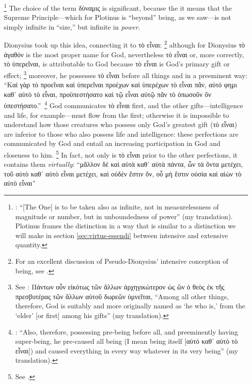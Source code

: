 %
\footnote{\cite[VI,~9,~6]{plotinus:enneads}: “[The One] is to be taken also as infinite, not in measurelessness of magnitude or number, but in unboundedness of power” (my translation). Plotinus frames the distinction in a way that is similar to a distinction we will make in section \ref{sec:virtus-essendi} between intensive and extensive quantity.} The choice of the term δύναμις is significant, because the it means that the Supreme Principle—which for Plotinus is “beyond” being, as we saw—is not simply infinite in “size,” but infinite in \emph{power}.

Dionysius took up this idea, connecting it to τὸ εἶναι:%
%
\footnote{For an excellent  discussion of Pseudo-Dionysius’ intensive conception of being, see \cite[50–56]{orourke:pseudo-dionysius}.} although for Dionysius τὸ ἀγαθόν is the most proper name for God, nevertheless τὸ εἶναι or, more correctly, τὸ ὑπερ\-εῖναι, is attributable to God because τὸ εἶναι is God’s primary gift or effect;%
%
\footnote{See \cite[V, 5]{pg:dionysius:DN}: Πάντων οὖν εἰκότως τῶν ἄλλων ἀρχηγικώτερον ὡς ὢν ὁ θεὸς ἐκ τῆς πρεσβυτέρας τῶν ἄλλων αὐτοῦ δωρεῶν ὑμνεῖται, “Among all other things, therefore, God is suitably and more originally named as ‘he who is,’ from the ‘elder’ [or first] among his gifts” (my translation).} moreover, he possesses τὸ εἶναι before all things and in a preeminent way: “Καὶ γὰρ τὸ προεῖναι καὶ ὑπερ\-εῖναι προέχων καὶ ὑπερ\-έχων τὸ εἶναι πᾶν, αὐτό φημι καθ᾿ αὑτὸ τὸ εἶναι, προϋπεστήσατο καὶ τῷ εἶναι αὐτῷ πᾶν τὸ ὁπωσοῦν ὂν ὑπεστήσατο.”\,%
%
\footnote{\Cite[V, 5]{pg:dionysius:DN}: “Also, therefore, possessing pre-being before all, and preeminently having super-being, he pre-caused all being (I mean being itself [αὐτό καθ᾿ αὑτὸ τὸ εἶναι]) and caused everything in every way whatever in its very being” (my translation).} God communicates τὸ εἶναι first, and the other gifts—intelligence and life, for example—must flow from the first; otherwise it is impossible to understand how those creatures who possess only God’s greatest gift (τὸ εἶναι) are inferior to those who also possess life and intelligence: these perfections are communicated by God and entail an increasing participation in God and closeness to him.%
%
\footnote{See \cite[V, 2]{pg:dionysius:DN}.} In fact, not only is τὸ εἶναι prior to the other perfections, it contains them \emph{virtually}: “μᾶλλον δὲ καὶ αὐτὰ καθ᾿ αὑτὰ πάντα, ὧν τὰ ὄντα μετέχει, τοῦ αὐτὸ καθ᾿ αὑτὸ εἶναι μετέχει, καὶ οὐδὲν ἔστιν ὄν, οὗ μὴ ἔστιν οὐσία καὶ αἰὼν τὸ αὐτὸ εἶναι”\,%
%
